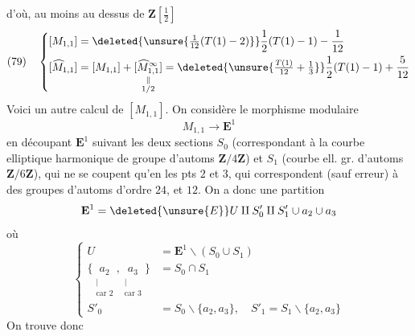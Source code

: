 d'où, au moins au dessus de $\mathbf Z[\frac12]$
\[
(79)\quad\left\{\begin{aligned}
[M_{1,1}]&=\deleted{\unsure{\tfrac1{12}(T(1)-2)}}\frac12(T(1)-1)-\frac1{12}\\
[\widehat M_{1,1}]&=[M_{1,1}]+\underset{\substack{\Vert\\1/2}}{[\widehat M^\infty_{1,1}]}=\deleted{\unsure{\tfrac{T(1)}{12}+\tfrac13}}\frac12(T(1)-1)+\frac5{12}
\end{aligned}\right.
\]
Voici un autre calcul de $[M_{1,1}]$. On considère le morphisme modulaire
\[
M_{1,1}\longrightarrow\mathbf E^1
\]
 en découpant $\mathbf E^1$ suivant les deux sections $S_0$ (correspondant à la courbe elliptique harmonique de groupe d'automs $\mathbf Z/4\mathbf Z$) et $S_1$  (courbe ell.   gr. d'automs $\mathbf Z/6\mathbf Z$), qui ne se coupent qu'en les pts $2$ et $3$, qui correspondent (sauf erreur) à des groupes d'automs d'ordre $24$, et $12$. On a donc une partition
\[
\mathbf E^1=\deleted{\unsure{E}}U\amalg S'_0\amalg S'_1\cup a_2\cup a_3
\]
où 
\[
\left\{\begin{aligned}
U&=\mathbf E^1\smallsetminus(S_0\cup S_1)\\
\{\underset{\substack{|\\\text{car }2}}{a_2},\underset{\substack{|\\\text{car }3}}{a_3}\}&=S_0\cap S_1\\
S'_0&=S_0\smallsetminus\{a_2,a_3\},\quad S'_1=S_1\smallsetminus\{a_2,a_3\}
\end{aligned}\right.
\]
On trouve donc

